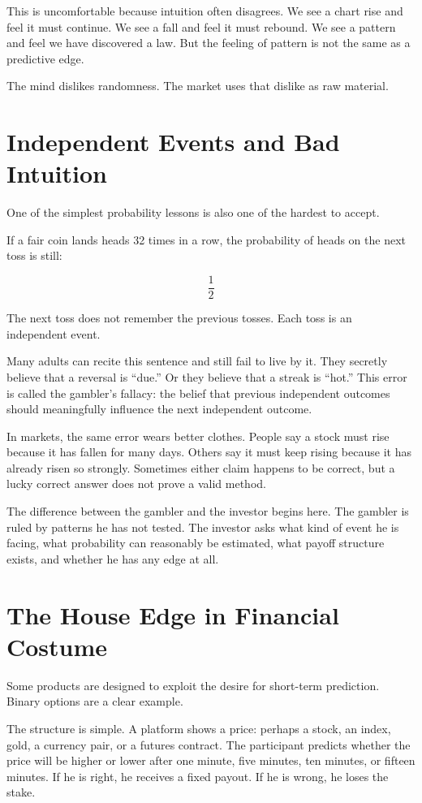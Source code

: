 This is uncomfortable because intuition often disagrees. We see a chart rise and feel it must continue. We see a fall and feel it must rebound. We see a pattern and feel we have discovered a law. But the feeling of pattern is not the same as a predictive edge.

The mind dislikes randomness. The market uses that dislike as raw material.

\section*{Independent Events and Bad Intuition}

One of the simplest probability lessons is also one of the hardest to accept.

If a fair coin lands heads 32 times in a row, the probability of heads on the next toss is still:

\[
\frac{1}{2}
\]

The next toss does not remember the previous tosses. Each toss is an independent event.

Many adults can recite this sentence and still fail to live by it. They secretly believe that a reversal is ``due.'' Or they believe that a streak is ``hot.'' This error is called the gambler's fallacy: the belief that previous independent outcomes should meaningfully influence the next independent outcome.

In markets, the same error wears better clothes. People say a stock must rise because it has fallen for many days. Others say it must keep rising because it has already risen so strongly. Sometimes either claim happens to be correct, but a lucky correct answer does not prove a valid method.

The difference between the gambler and the investor begins here. The gambler is ruled by patterns he has not tested. The investor asks what kind of event he is facing, what probability can reasonably be estimated, what payoff structure exists, and whether he has any edge at all.

\section*{The House Edge in Financial Costume}

Some products are designed to exploit the desire for short-term prediction. Binary options are a clear example.

The structure is simple. A platform shows a price: perhaps a stock, an index, gold, a currency pair, or a futures contract. The participant predicts whether the price will be higher or lower after one minute, five minutes, ten minutes, or fifteen minutes. If he is right, he receives a fixed payout. If he is wrong, he loses the stake.

